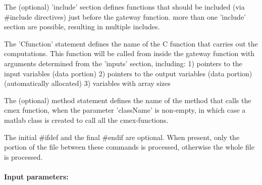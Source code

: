 The (optional) 'include' section defines functions that
should be included (via \#include directives) just before the gateway function.
more than one 'include' section are possible, resulting in multiple
includes.
 
The 'Cfunction' statement defines the name of the
C function that carries out the computations. This function will
be called from inside the gateway function with arguments determined
from the 'inputs' section, including:
  1) pointers to the input variables (data portion)
  2) pointers to the output variables (data portion)
     (automatically allocated)
  3) variables with array sizes
 
The (optional) method statement defines the name of the method
that calls the cmex function, when the parameter 'className' is non-empty,
in which case a matlab class is created to call all the cmex-functions.
 
The initial \#ifdef and the final \#endif are optional. When present,
only the portion of the file between these commands is processed,
otherwise the whole file is processed. 

\paragraph{Input parameters:}

